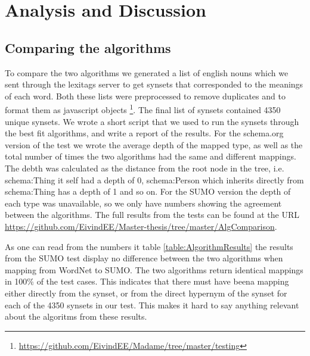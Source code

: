 
\chapter{Analysis and Discussion} %

\label{AnalysisAndDiscussion}


\section{Comparing the algorithms}
\label{ComparingAlgorithms}
To compare the two algorithms we generated a list of english nouns
which we sent through the lexitags server to get synsets that corresponded to the meanings of each word.
Both these lists were preprocessed to remove duplicates and to format them as javascript objects
\footnote{\url{https://github.com/EivindEE/Madame/tree/master/testing}}.
The final list of synsets contained 4350 unique synsets.
We wrote a short script that we used to run the synsets through the best fit algorithms,
and write a report of the results.
For the schema.org version of the test we wrote the average depth of the mapped type,
as well as the total number of times the two algorithms had the same and different mappings.
The debth was calculated as the distance from the root node in the tree,
i.e. schema:Thing it self had a depth of 0,
schema:Person which inherits directly from schema:Thing has a depth of 1 and so on.
For the SUMO version the depth of each type was unavailable,
so we only have numbers showing the agreement between the algorithms.
The full results from the tests can be found at the URL \url{https://github.com/EivindEE/Master-thesis/tree/master/AlgComparison}.

As one can read from the numbers it table \ref{table:AlgorithmResults} the results from the SUMO test
display no difference between the two algorithms when mapping from WordNet to SUMO.
The two algorithms return identical mappings in 100\% of the test cases.
This indicates that there must have beena mapping either directly from the synset,
or from the direct hypernym of the synset for each of the 4350 synsets in our test.
This makes it hard to say anything relevant about the algoritms from these results.

